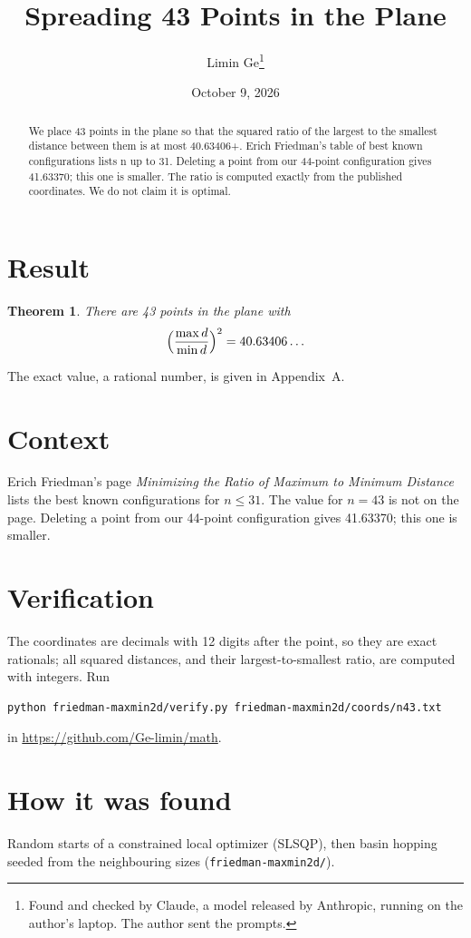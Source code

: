 \documentclass[11pt,a4paper]{article}
\title{Spreading 43 Points in the Plane}
\author{Limin Ge\thanks{Found and checked by Claude, a model released by Anthropic, running on the author's laptop. The author sent the prompts.}}
\date{October 9, 2026}
\newtheorem*{theorem}{Theorem}
\begin{document}
\maketitle
\begin{abstract}
We place 43 points in the plane so that the squared ratio of the largest to the smallest distance between them is at most 40.63406+. Erich Friedman's table of best known configurations lists n up to 31. Deleting a point from our 44-point configuration gives 41.63370; this one is smaller. The ratio is computed exactly from the published coordinates. We do not claim it is optimal.
\end{abstract}

\section{Result}
\begin{theorem}
There are 43 points in the plane with
\[ \Bigl(\frac{\max d}{\min d}\Bigr)^2 = 40.63406\ldots \]
\end{theorem}
The exact value, a rational number, is given in Appendix~A.


\section{Context}
Erich Friedman's page \emph{Minimizing the Ratio of Maximum to Minimum Distance} lists the best known configurations for $n\le 31$. The value for $n=43$ is not on the page. Deleting a point from our 44-point configuration gives 41.63370; this one is smaller.


\section{Verification}
The coordinates are decimals with 12 digits after the point, so they are exact rationals; all squared distances, and their largest-to-smallest ratio, are computed with integers. Run
\begin{verbatim}
python friedman-maxmin2d/verify.py friedman-maxmin2d/coords/n43.txt
\end{verbatim}
in \url{https://github.com/Ge-limin/math}.


\section{How it was found}
Random starts of a constrained local optimizer (SLSQP), then basin hopping seeded from the neighbouring sizes (\texttt{friedman-maxmin2d/}).
\end{document}

